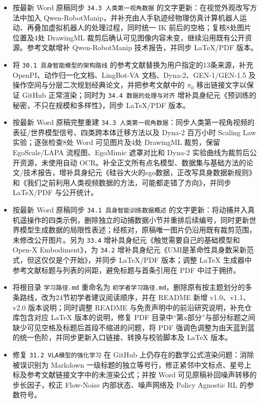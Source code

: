 \begin{itemize}
\item
  按最新 Word 原稿同步 \texttt{34.3\ 人类第一视角数据} 的文字更新：在视觉外观改写方法中加入 Qwen-RobotManip，并补充由人手轨迹经物理仿真计算机器人运动、再叠加虚拟机器人的处理过程，同时统一 IK 前后的空格；复核8处图片位置及4处 DrawingML 裁剪后确认可见图像内容未变，继续沿用既有公开资源。参考文献增补 Qwen-RobotManip 技术报告，并同步 LaTeX/PDF 版本。
\item
  将 \texttt{30.1\ 具身智能模型的架构路线} 的参考文献替换为用户指定的13条来源，补充 OpenPI、动作归一化文档、LingBot-VA 文档、Dyna-2、GEN-1/GEN-1.5 及操作空间与分层二次规划经典论文，并把参考文献中的 \(\pi_0\) 移出链接文字以保证 GitHub 正常渲染；同时为 \texttt{34.4\ 数据的处理与对齐} 增补具身纪元《预训练的秘密，不只在规模和多样性》，同步 LaTeX/PDF 版本。
\item
  按最新 Word 原稿完整重建 \texttt{34.3\ 人类第一视角数据}：同步人类第一视角视频的表征/世界模型信号、四类跨本体迁移方法以及 Dyna-2 百万小时 Scaling Law 实验；逐张检查8处 Word 可见图片及4处 DrawingML 裁剪，保留 EgoScale/LAPA 流程图、EgoMimic 遮罩对比和 Dyna-2 实验曲线为裁剪后公开资源，未使用自动 OCR。补全正文所有点名模型、数据集与基础方法的论文/技术报告，增补具身纪元《硅谷大火的ego数据，正改写具身数据新规则》和《我们之前利用人类视频数据的方法，可能都走错了方向》，并同步 LaTeX/PDF 与公开统计。
\item
  按最新 Word 原稿同步 \texttt{34.1\ 具身智能训练数据概述} 的文字更新：将动捕并入真机遥操作的四类示例，删除独立的动捕数据小节并重排后续编号，同时更新世界模型生成数据的局限性表述；经核对，原稿唯一图片仍沿用既有裁剪范围，未修改公开图片。另为 \texttt{33.4} 增补具身纪元《触觉需要自己的基础模型和Open-X Embodiment》，为 \texttt{34.2} 增补具身纪元《UMI是革命性具身数采新范式，但这仅仅是个开始》，并同步 LaTeX/PDF 版本；调整 LaTeX 生成器中参考文献标题与列表的间距，避免标题与首条引用在 PDF 中过于拥挤。
\item
  将根目录 \texttt{学习路径.md} 重命名为 \texttt{初学者学习路径.md}，删除原有按主题划分的多条路线，改为24节初学者建议阅读顺序，并在 README 新增 v1.0、v1.1、v2.0 版本说明；同时调整 README 与免责声明中的前沿研究说明，补充仓库包含对应 LaTeX 版本的说明，修复 PDF 目录中``第x部分''与部分标题之间缺少可见空格及标题后首段不缩进的问题，将 PDF 强调色调整为由天蓝到蓝的统一色阶，并同步更新入口链接、转换与校验脚本及 LaTeX 版本。
\item
  修复 \texttt{31.2\ VLA模型的强化学习} 在 GitHub 上仍存在的数学公式渲染问题：消除被误识别为 Markdown 一级标题的独立等号行，修正紧邻中文标点、星号上标及参考文献链接文字中的未渲染公式；并按 Word 可见原稿补回噪声转移的步长因子，校正 Flow-Noise 内部状态、噪声网络及 Policy Agnostic RL 的参数符号。

\end{itemize}
